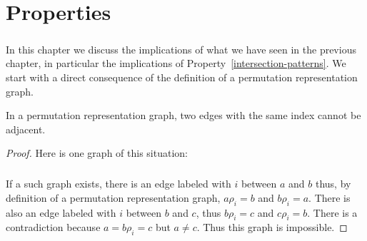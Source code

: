 \chapter{Properties}
\label{Properties}

\paragraph{}
In this chapter we discuss the implications of what we have seen in the previous chapter, in particular the implications of Property~\ref{intersection-patterns}. We start with a direct consequence of the definition of a permutation representation graph.

\begin{proposition}
  \label{fixed-only-1}
  In a permutation representation graph, two edges with the same index cannot be adjacent.
\end{proposition}

\begin{proof}
  Here is one graph of this situation:

  \begin{figure}[H]
    \begin{center}
      \caption{}
    \end{center}
  \end{figure}

  \paragraph{}
  If a such graph exists, there is an edge labeled with $i$ between $a$ and $b$ thus, by definition of a permutation representation graph, $a \rho_i = b$ and $b \rho_i = a$. There is also an edge labeled with $i$ between $b$ and $c$, thus $b \rho_i = c$ and $c \rho_i = b$. There is a contradiction because $a = b \rho_i = c$ but $a \neq c$. Thus this graph is impossible.
\end{proof}

